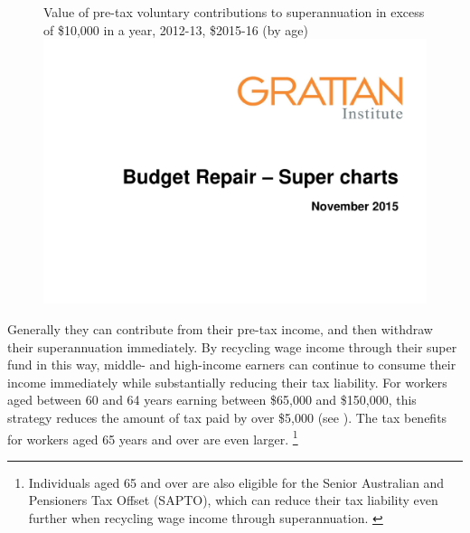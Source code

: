 \documentclass{grattanAlpha}
\begin{document}
\begin{figure}
%
{Value of pre-tax voluntary contributions to superannuation in excess of \$10,000 in a year, 2012-13, \$2015-16 (by age)}
\includegraphics[width=\columnwidth,page=25]{super-atlas/PPTX.pdf}
\end{figure}


Generally they can contribute from their pre-tax income, and then withdraw their superannuation immediately. By recycling wage income through their super fund in this way, middle- and high-income earners can continue to consume their income immediately while substantially reducing their tax liability. For workers aged between 60 and 64 years earning between \$65,000 and \$150,000, this strategy reduces the amount of tax paid by over \$5,000 (see ). The tax benefits for workers aged 65 years and over are even larger.%
\footnote{Individuals aged 65 and over are also eligible for the Senior Australian and Pensioners Tax Offset (SAPTO), which can reduce their tax liability even further when recycling wage income through superannuation. \textcite{ATO2015-Beneficiary-tax-offset-sapto-calculator}} 
\end{document}
